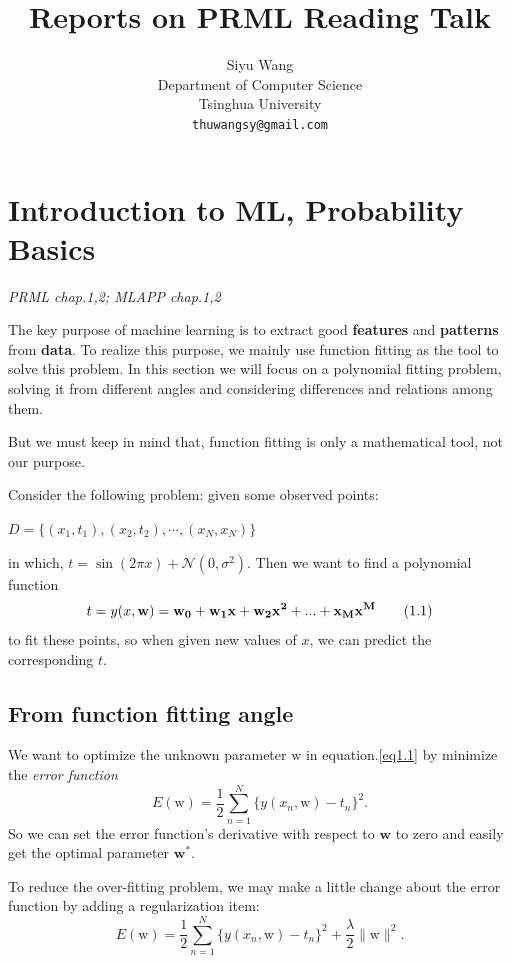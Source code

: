 \documentclass{article}
\title{Reports on PRML Reading Talk}
\author{
  Siyu Wang\\
  Department of Computer Science\\
  Tsinghua University\\
  \texttt{thuwangsy@gmail.com} \\
}
\newcommand{\normD}{\mathcal{N}}
\newcommand{\mrm}{\mathrm}
\newcommand{\mbf}{\mathbf}
\begin{document}
\maketitle

\section{Introduction to ML, Probability Basics}
\emph{PRML chap.1,2; MLAPP chap.1,2}

The key purpose of machine learning is to extract good \textbf{features} and \textbf{patterns} from \textbf{data}. To realize this purpose, we mainly use function fitting as the tool to solve this problem. In this section we will focus on a polynomial fitting problem, solving it from different angles and considering differences and relations among them. 

But we must keep in mind that, function fitting is only a mathematical tool, not our purpose.

Consider the following problem: given some observed points:
\begin{center}
$D=\{(x_1,t_1),(x_2,t_2), \cdots, (x_N,x_N)\}$
\end{center}
in which, $t = \sin(2\pi x)+\normD(0, \sigma^2)$. Then we want to find a polynomial function
\begin{equation}\label{eq1.1}
    t = y(x,\bf{w})= w_0+w_1x+w_2x^2+...+x_M x^M \tag{1.1}
\end{equation}
to fit these points, so when given new values of $x$, we can predict the corresponding $t$.

\subsection*{From function fitting angle}
We want to optimize the unknown parameter $\mrm{w}$ in equation.\ref{eq1.1} by minimize the \emph{error function}
\begin{equation}\label{eq1.2}
    E(\mrm w) = \frac12\sum_{n=1}^N\{y(x_n, \mrm w)-t_n\}^2.\tag{1.2}
\end{equation}
So we can set the error function's derivative with respect to $\textbf{w}$ to zero and easily get the optimal parameter $\mbf{w}^*$. 

To reduce the over-fitting problem, we may make a little change about the error function by adding a regularization item:
\begin{equation}\label{eq1.3}
    E(\mrm w) = \frac12\sum_{n=1}^N\{y(x_n, \mrm w)-t_n\}^2 + \frac{\lambda}{2}\|\mrm w\|^2. \tag{1.3}
\end{equation}
\end{document}
